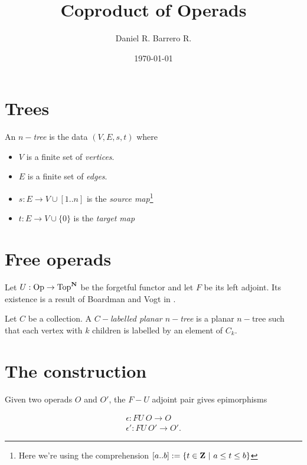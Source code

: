 \documentclass{amsart}
\title{Coproduct of Operads}
\author{Daniel R. Barrero R.}
\date{\today}
\begin{document}

\maketitle

\section{Trees}

\begin{defn}\label{def-tree}
	An $n-$\emph{tree} is the data $(V, E, s, t)$ where
	\begin{itemize}
		\item $V$ is a finite set of \emph{vertices}.
		\item $E$ is a finite set of \emph{edges}.
		\item $s : E \to V \cup [1..n]$ is the
			\emph{source map}\footnote{Here we're using the
			comprehension $[a..b] :=
			\{t \in \mathbf{Z} \ | \ a \leq t \leq b\}$}
		\item $t : E \to V \cup \{0\}$ is the \emph{target map}
	\end{itemize}
\end{defn}

\section{Free operads}

Let $U : \mathrm{Op} \to \mathrm{Top}^{\mathbf{N}}$ be the forgetful functor and
let $F$ be its left adjoint. Its existence is a result of Boardman and Vogt
in \cite{bv-hiasots}.

\begin{defn}
	Let $C$ be a collection. A \emph{$C-$labelled planar $n-$tree} is a
	planar $n-$tree such that each vertex with $k$ children is labelled
	by an element of $C_k$.
\end{defn}

	

\section{The construction}

Given two operads $O$ and $O'$, the $F-U$ adjoint pair gives epimorphisms 

\begin{eqnarray}\label{fu-epis}
	\epsilon : FU \ O \to O \\
	\epsilon' : FU \ O' \to O'.
\end{eqnarray}
\end{document}
